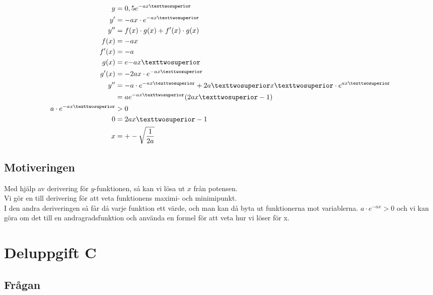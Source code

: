 \documentclass[a4paper,12pt]{article}
\begin{document}
      \begin{align}
        \label{eq:2}
        y &= 0,5e^{-ax²} \nonumber
        \\
        y^{\prime} &= -ax \cdot e^{-ax²} \nonumber
        \\
        y^{\prime \prime} &= f(x) \cdot g(x) + f^{\prime}(x) \cdot g(x) 
        \nonumber
        \\
        f(x) &= -ax \nonumber 
        \\
        f^{\prime}(x) &= -a \nonumber 
        \\
        g(x) &= e{-ax²} \nonumber 
        \\
        g^{\prime}(x) &= -2ax \cdot e^{-ax²} \nonumber 
        \\
        y^{\prime \prime} &= -a \cdot e^{-ax²} + 2a²x² \cdot e^{\-ax²} 
        \nonumber 
        \\
        &= ae^{-ax²}(2ax²-1) \nonumber 
        \\
        a \cdot e^{-ax²} &> 0 \nonumber 
        \\
        0 &= 2ax²-1 \nonumber 
        \\
        x &= +-\sqrt{\frac{1}{2a}}
      \end{align}

      \newpage
    \subsection{Motiveringen}

      Med hjälp av derivering för $y$-funktionen, så kan vi lösa ut $x$ från 
      potensen.
      \\
      Vi gör en till derivering för att veta funktionens maximi- och 
      minimipunkt. 
      \\
      I den andra deriveringen så får då varje funktion ett värde, och man kan
      då byta ut funktionerna mot variablerna. $a \cdot e^{-ax} > 0$ och vi 
      kan göra om det till en andragradsfunktion och använda en formel för 
      att veta hur vi löser för x.

\section{Deluppgift C}
\label{sec:uppg3}

  \subsection{Frågan}
  
\end{document}

